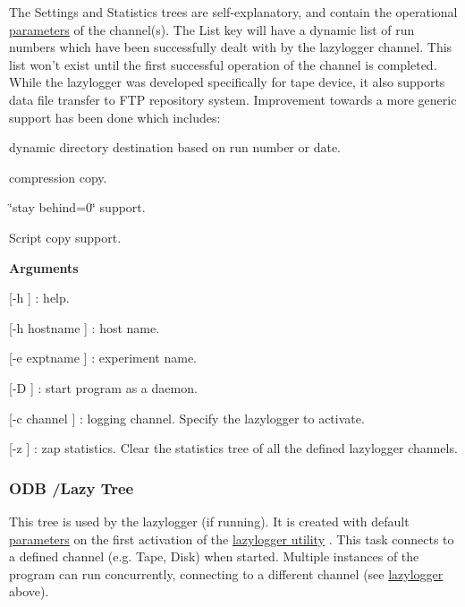 The Settings and Statistics trees are self-\/explanatory, and contain the operational \hyperlink{structparameters}{parameters} of the channel(s). The List key will have a dynamic list of run numbers which have been successfully dealt with by the lazylogger channel. This list won't exist until the first successful operation of the channel is completed. \label{F_LogUtil_idx_FTP_channel_lazylogger}
\hypertarget{F_LogUtil_idx_FTP_channel_lazylogger}{}
 While the lazylogger was developed specifically for tape device, it also supports data file transfer to FTP repository system. Improvement towards a more generic support has been done which includes:
\begin{DoxyItemize}
\item dynamic directory destination based on run number or date.
\item compression copy.
\item \char`\"{}stay behind=0\char`\"{} support.
\item Script copy support.
\end{DoxyItemize}


\begin{DoxyItemize}
\item {\bfseries  Arguments }
\begin{DoxyItemize}
\item \mbox{[}-\/h \mbox{]} : help.
\item \mbox{[}-\/h hostname \mbox{]} : host name.
\item \mbox{[}-\/e exptname \mbox{]} : experiment name.
\item \mbox{[}-\/D \mbox{]} : start program as a daemon.
\item \mbox{[}-\/c channel \mbox{]} : logging channel. Specify the lazylogger to activate.
\item \mbox{[}-\/z \mbox{]} : zap statistics. Clear the statistics tree of all the defined lazylogger channels.
\end{DoxyItemize}
\end{DoxyItemize}

\par


\par


\label{F_LogUtil_ODB_tree_Lazy}
\hypertarget{F_LogUtil_ODB_tree_Lazy}{}
 \hypertarget{F_LogUtil_F_ODB_Lazy_Tree}{}\subsubsection{ODB /Lazy Tree}\label{F_LogUtil_F_ODB_Lazy_Tree}
This tree is used by the lazylogger (if running). It is created with default \hyperlink{structparameters}{parameters} on the first activation of the \hyperlink{F_LogUtil_F_lazylogger_utility}{lazylogger utility} . This task connects to a defined channel (e.g. Tape, Disk) when started. Multiple instances of the program can run concurrently, connecting to a different channel (see \hyperlink{F_LogUtil_F_lazylogger_utility}{lazylogger} above).

